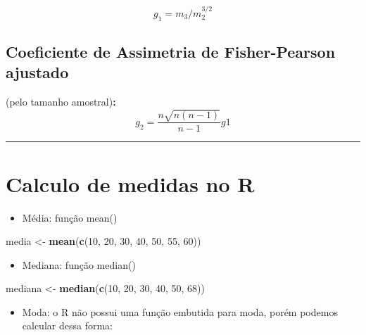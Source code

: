 \documentclass[
]{book}
\newenvironment{Shaded}{\begin{snugshade}}{\end{snugshade}}
\newcommand{\DecValTok}[1]{\textcolor[rgb]{0.00,0.00,0.81}{#1}}
\newcommand{\FunctionTok}[1]{\textcolor[rgb]{0.13,0.29,0.53}{\textbf{#1}}}
\newcommand{\NormalTok}[1]{#1}
\newcommand{\OtherTok}[1]{\textcolor[rgb]{0.56,0.35,0.01}{#1}}
\providecommand{\tightlist}{%
  \setlength{\itemsep}{0pt}\setlength{\parskip}{0pt}}
\begin{document}
\[g_1 = m_3/m_2^{3/2}\]

\subsection{Coeficiente de Assimetria de Fisher-Pearson ajustado}\label{coeficiente-de-assimetria-de-fisher-pearson-ajustado}

(pelo tamanho amostral)\textbf{:} \[g_2 = \frac{n\sqrt{n(n-1)}}{n-1}g1\]

\begin{center}\rule{0.5\linewidth}{0.5pt}\end{center}

\section{Calculo de medidas no R}\label{calculo-de-medidas-no-r}

\begin{itemize}
\tightlist
\item
  Média: função mean()
\end{itemize}

\begin{Shaded}
\begin{Highlighting}[]
\NormalTok{media }\OtherTok{\textless{}{-}} \FunctionTok{mean}\NormalTok{(}\FunctionTok{c}\NormalTok{(}\DecValTok{10}\NormalTok{, }\DecValTok{20}\NormalTok{, }\DecValTok{30}\NormalTok{, }\DecValTok{40}\NormalTok{, }\DecValTok{50}\NormalTok{, }\DecValTok{55}\NormalTok{, }\DecValTok{60}\NormalTok{))}
\end{Highlighting}
\end{Shaded}

\begin{itemize}
\tightlist
\item
  Mediana: função median()
\end{itemize}

\begin{Shaded}
\begin{Highlighting}[]
\NormalTok{mediana }\OtherTok{\textless{}{-}} \FunctionTok{median}\NormalTok{(}\FunctionTok{c}\NormalTok{(}\DecValTok{10}\NormalTok{, }\DecValTok{20}\NormalTok{, }\DecValTok{30}\NormalTok{, }\DecValTok{40}\NormalTok{, }\DecValTok{50}\NormalTok{, }\DecValTok{68}\NormalTok{))}
\end{Highlighting}
\end{Shaded}

\begin{itemize}
\tightlist
\item
  Moda: o R não possui uma função embutida para moda, porém podemos calcular dessa forma:
\end{itemize}
\end{document}
